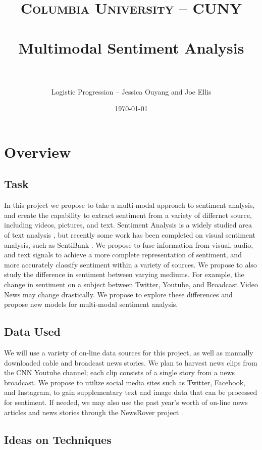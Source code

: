 \documentclass[paper=a4, fontsize=11pt]{scrartcl} %
\title{	
\normalfont \normalsize 
\textsc{Columbia University -- CUNY} \\ [25pt] %
\horrule{0.5pt} \\[0.4cm] %
\huge Multimodal Sentiment Analysis \\ %
\horrule{2pt} \\[0.5cm] %
}
\author{Logistic Progression -- Jessica Ouyang and Joe Ellis} %
\date{\normalsize\today} %
\begin{document}
\maketitle %


\section{Overview}


\subsection{Task}
In this project we propose to take a multi-modal approach to sentiment analysis, and create the capability to extract sentiment from a variety of differnet source, including videos, pictures, and text.
Sentiment Analysis is a widely studied area of text analysis \cite{Pang}, but recently some work has been completed on visual sentiment analysis, such as SentiBank \cite{MM13:sentibank_long}.
We propose to fuse information from visual, audio, and text signals to achieve a more complete representation of sentiment, and more accurately classify sentiment within a variety of sources. 
We propose to also study the difference in sentiment between varying mediums.
For example, the change in sentiment on a subject between Twitter, Youtube, and Broadcast Video News may change drastically.
We propose to explore these differences and propose new models for multi-modal sentiment analysis.


\subsection{Data Used}
We will use a variety of on-line data sources for this project, as well as manually downloaded cable and broadcast news stories. 
We plan to harvest news clips from the CNN Youtube channel; each clip consists of a single story from a news broadcast.
We propose to utilize social media sites such as Twitter, Facebook, and Instagram, to gain supplementary text and image data that can be processed for sentiment.
If needed, we may also use the past year's worth of on-line news articles and news stories through the NewsRover project \cite{MM13:structurednews}.

\subsection{Ideas on Techniques}
\end{document}
